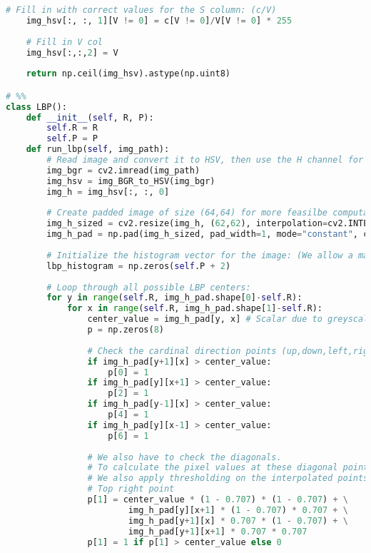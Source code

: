 \documentclass{article}
\begin{document}
\begin{lstlisting}[language=Python]
    # Fill in with correct values for the S column: (c/V)
    img_hsv[:, :, 1][V != 0] = c[V != 0]/V[V != 0] * 255
    
    # Fill in V col
    img_hsv[:,:,2] = V
    
    return np.ceil(img_hsv).astype(np.uint8)

# %%
class LBP():
    def __init__(self, R, P):
        self.R = R
        self.P = P
    def run_lbp(self, img_path):
        # Read image and convert it to HSV, then use the H channel for all downstream tasks.
        img_bgr = cv2.imread(img_path)
        img_hsv = img_BGR_to_HSV(img_bgr)
        img_h = img_hsv[:, :, 0]
        
        # Create padded image of size (64,64) for more feasilbe computation
        img_h_sized = cv2.resize(img_h, (62,62), interpolation=cv2.INTER_AREA)
        img_h_pad = np.pad(img_h_sized, pad_width=1, mode="constant", constant_values=0)
        
        # Initialize the histogram vector for the image: (We allow a max index of P + 1 0->9 in this case)
        lbp_histogram = np.zeros(self.P + 2)
        
        # Loop through all possible LBP centers:
        for y in range(self.R, img_h_pad.shape[0]-self.R):
            for x in range(self.R, img_h_pad.shape[1]-self.R):
                center_value = img_h_pad[y, x] # Scalar due to greyscale
                p = np.zeros(8)
                
                # Check the cardinal direction points (up,down,left,right)
                if img_h_pad[y+1][x] > center_value:
                    p[0] = 1
                if img_h_pad[y][x+1] > center_value:
                    p[2] = 1
                if img_h_pad[y-1][x] > center_value:
                    p[4] = 1
                if img_h_pad[y][x-1] > center_value:
                    p[6] = 1
                    
                # We also have to check the diagonals.
                # To calculate the pixel values at these diagonal points, we need to do pixel-interpolation
                # We also apply thresholding on the interpolated points compared to the center to determine 0/1.
                # Top right point
                p[1] = center_value * (1 - 0.707) * (1 - 0.707) + \
                        img_h_pad[y][x+1] * (1 - 0.707) * 0.707 + \
                        img_h_pad[y+1][x] * 0.707 * (1 - 0.707) + \
                        img_h_pad[y+1][x+1] * 0.707 * 0.707        
                p[1] = 1 if p[1] > center_value else 0
                

\end{lstlisting}
\end{document}
